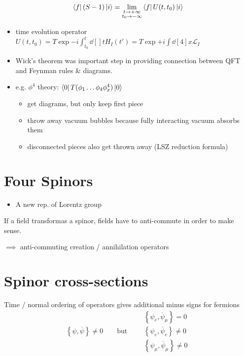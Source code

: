 \begin{equation}
  \bra{f}(S- 1)\ket{i} = \lim_{\substack{t \to +\infty \\ t_0 \to - \infty}} \bra{f} U(t, t_0) \ket{i}
\end{equation}
\begin{itemize}
  \item time evolution operator $U(t, t_0) = T\exp{-i \int_{t_0}^{t} \dd[]{t} H_I(t')} = T \exp{+i \int \dd[4]{x} \mathcal{L}_I}$ 
  \item Wick's theorem was important step in providing connection between QFT and Feynman rules \& diagrams.
  \item e.g. $\phi^4$ theory: $\bra{0} T (\phi_1 \dots \phi_4 \phi_x^4) \ket{0}$
    \begin{itemize}
      \item get diagrams, but only keep first piece
      \item throw away vacuum bubbles because fully interacting vacuum absorbs them
      \item disconnected pieces also get thrown away (LSZ reduction formula)
    \end{itemize}
\end{itemize}

\section*{Four Spinors}%

\begin{itemize}
  \item A new rep. of Lorentz group
\end{itemize}
If a field transformas a spinor, fields have to anti-commute in order to make sense.\par
$\implies$ anti-commuting creation / annihilation operators

\section*{Spinor cross-sections}%

Time / normal ordering of operators gives additional minus signs for fermions
\begin{equation}
  \left\{ \psi, \overline{\psi} \right\} \neq 0 \qquad \text{but} \qquad 
  \begin{gathered}
    \left\{ \psi_e, \overline{\psi}_{\mu} \right\} = 0 \\
    \left\{ \psi_e, \overline{\psi}_{e} \right\} \neq 0 \\
    \left\{ \psi_{\mu}, \overline{\psi}_{\mu} \right\} \neq 0
  \end{gathered}
\end{equation}

